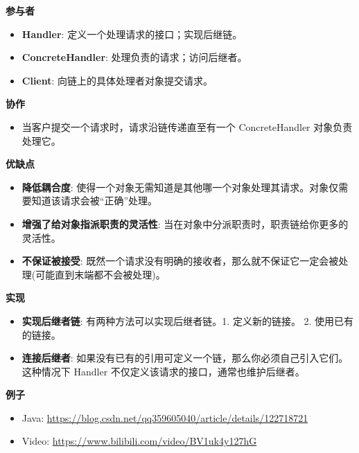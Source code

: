\noindent\textbf{参与者}

\begin{itemize}
    \item \textbf{Handler}: 定义一个处理请求的接口；实现后继链。
    \item \textbf{ConcreteHandler}: 处理负责的请求；访问后继者。
    \item \textbf{Client}: 向链上的具体处理者对象提交请求。
\end{itemize}

\noindent\textbf{协作}

\begin{itemize}
    \item 当客户提交一个请求时，请求沿链传递直至有一个 ConcreteHandler 对象负责处理它。
\end{itemize}

\noindent\textbf{优缺点}

\begin{itemize}
    \item \textbf{降低耦合度}: 使得一个对象无需知道是其他哪一个对象处理其请求。对象仅需要知道该请求会被``正确''处理。
    \item \textbf{增强了给对象指派职责的灵活性}: 当在对象中分派职责时，职责链给你更多的灵活性。
    \item \textbf{不保证被接受}: 既然一个请求没有明确的接收者，那么就不保证它一定会被处理(可能直到末端都不会被处理)。
\end{itemize}

\noindent\textbf{实现}

\begin{itemize}
    \item \textbf{实现后继者链}: 有两种方法可以实现后继者链。1. 定义新的链接。 2. 使用已有的链接。
    \item \textbf{连接后继者}: 如果没有已有的引用可定义一个链，那么你必须自己引入它们。这种情况下 Handler 不仅定义该请求的接口，通常也维护后继者。
\end{itemize}

\noindent\textbf{例子}

\begin{itemize}
    \item Java: \url{https://blog.csdn.net/qq359605040/article/details/122718721}
    \item Video: \url{https://www.bilibili.com/video/BV1uk4y127hG}
\end{itemize}



\newpage